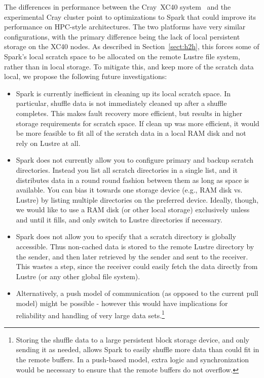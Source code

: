 The differences in performance between the Cray\textregistered~XC40\textsuperscript{\tiny\texttrademark} system~\cite{alverson2012cray,craycascadesc12} and the experimental Cray cluster point to optimizations to Spark that could improve its performance on HPC-style architectures.  The two platforms have very similar configurations, with the primary difference being the lack of local persistent storage on the XC40 nodes.  As described in Section~\ref{sect:h2h}, this forces some of Spark's local scratch space to be allocated on the remote Lustre file system, rather than in local storage.  To mitigate this, and keep more of the scratch data local, we propose the following future investigations:
\begin{itemize}
\item Spark is currently inefficient in cleaning up its local scratch space.  In particular, shuffle data is not immediately cleaned up after a shuffle completes.  This makes fault recovery more efficient, but results in higher storage requirements for scratch space.  If clean up was more efficient, it would be more feasible to fit all of the scratch data in a local RAM disk and not rely on Lustre at all.
\item Spark does not currently allow you to configure primary and backup scratch directories.  Instead you list all scratch directories in a single list, and it distributes data in a round round fashion between them as long as space is available.  You can bias it towards one storage device (e.g., RAM disk vs. Lustre) by listing multiple directories on the preferred device.  Ideally, though, we would like to use a RAM disk (or other local storage) exclusively unless and until it fills, and only switch to Lustre directories if necessary.
\item Spark does not allow you to specify that a scratch directory is globally accessible.  Thus non-cached data is stored to the remote Lustre directory by the sender, and then later retrieved by the sender and sent to the receiver.  This wastes a step, since the receiver could easily fetch the data directly from Lustre (or any other global file system).
\item Alternatively, a push model of communication (as opposed to the current pull model) might be possible - however this would have implications for reliability and handling of very large data sets.\footnote{Storing the shuffle data to a large persistent block storage device, and only sending it as needed, allows Spark to easily shuffle more data than could fit in the remote buffers.  In a push-based model, extra logic and synchronization would be necessary to ensure that the remote buffers do not overflow.}
\end{itemize}
